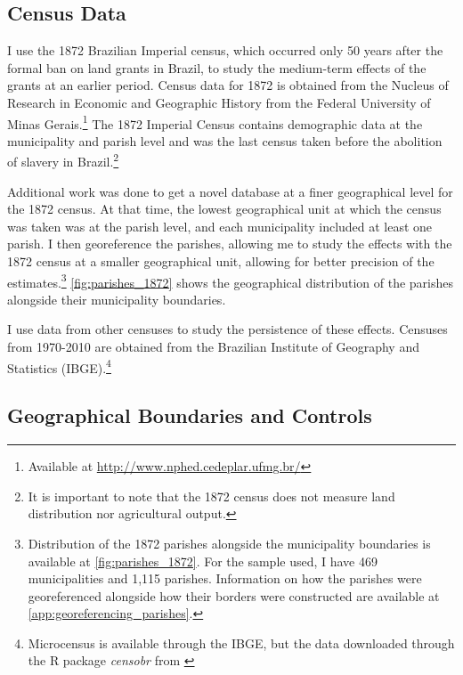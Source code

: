 \documentclass[11pt]{article}
\begin{document}
\subsection{Census Data}

I use the 1872 Brazilian Imperial census, which occurred only 50 years after the formal ban on land grants in Brazil, to study the medium-term effects of the grants at an earlier period.
Census data for 1872 is obtained from the Nucleus of Research in Economic and Geographic History from the Federal University of Minas Gerais.\footnote{
  Available at \url{http://www.nphed.cedeplar.ufmg.br/}}
The 1872 Imperial Census contains demographic data at the municipality and parish level and was the last census taken before the abolition of slavery in Brazil.\footnote{It is important to note that the 1872 census does not measure land distribution nor agricultural output.}

Additional work was done to get a novel database at a finer geographical level for the 1872 census.
At that time, the lowest geographical unit at which the census was taken was at the parish level, and each municipality included at least one parish.
I then georeference the parishes, allowing me to study the effects with the 1872 census at a smaller geographical unit, allowing for better precision of the estimates.\footnote{Distribution of the 1872 parishes alongside the municipality boundaries is available at \autoref{fig:parishes_1872}. For the sample used, I have 469 municipalities and 1,115 parishes. Information on how the parishes were georeferenced alongside how their borders were constructed are available at \autoref{app:georeferencing_parishes}.} %
\autoref{fig:parishes_1872} shows the geographical distribution of the parishes alongside their municipality boundaries. 

I use data from other censuses to study the persistence of these effects.
Censuses from 1970-2010 are obtained from the Brazilian Institute of Geography and Statistics (IBGE).\footnote{Microcensus is available through the IBGE, but the data downloaded through the R package \textit{censobr} from \textcite{Pereira2023-qv}}

\subsection{Geographical Boundaries and Controls}
\end{document}

